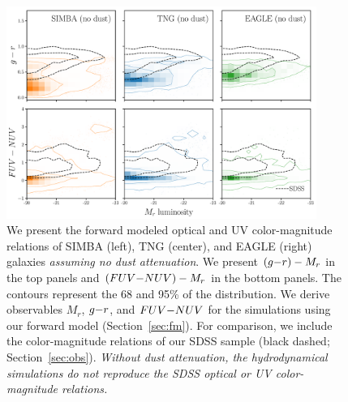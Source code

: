 \begin{figure}
\begin{center}
\includegraphics[width=0.9\textwidth]{figs/observables.pdf} 
    \caption{\label{fig:obs}
    We present the forward modeled optical and UV color-magnitude relations
    of SIMBA (left), TNG (center), and EAGLE (right) galaxies
    \emph{assuming no dust attenuation}. We present $(g{-}r)-M_r$ in the top
    panels and $(FUV{-}NUV)-M_r$ in the bottom panels. The contours represent
    the 68 and 95\% of the distribution. We derive observables $M_r$, $g{-}r$, 
    and $FUV{-}NUV$ for the simulations using our forward model
    (Section~\ref{sec:fm}). For comparison, we include the color-magnitude
    relations of our SDSS sample (black dashed; Section~\ref{sec:obs}). 
    {\em Without dust attenuation, the hydrodynamical simulations do not
    reproduce the SDSS optical or UV color-magnitude relations.}
    }
\end{center}
\end{figure}
